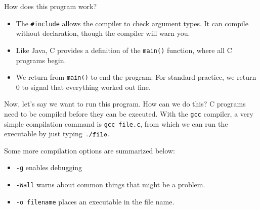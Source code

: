 \lstset{
caption=A First Program
}


How does this program work? 
\begin{itemize}
    \item The \verb!#include! allows the compiler to check argument types. It can compile without declaration, though the compiler will warn you. 
    \item Like Java, C provides a definition of the \verb!main()! function, where all C programs begin. 
    \item We return from \verb!main()! to end the program. For standard practice, we return $0$ to signal that everything worked out fine. 
\end{itemize}

Now, let's say we want to run this program. How can we do this? C programs need to be compiled before they can be executed. With the \verb!gcc! compiler, a very simple compilation command is \verb!gcc file.c!, from which we can run the executable by just typing $\verb!./file!$. 

Some more compilation options are summarized below: \begin{itemize}
    \item \verb!-g! enables debugging
    \item \verb!-Wall! warns about common things that might be a problem.
    \item \verb!-o filename! places an executable in the file name.
\end{itemize}